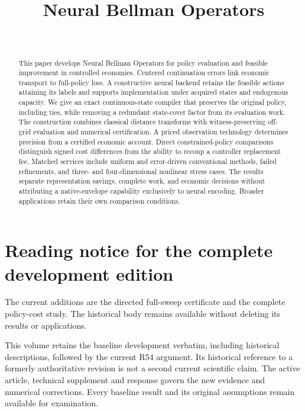 \documentclass[ecta,nameyear,draft]{econsocart}
\begin{document}
\begin{frontmatter}
\title{Neural Bellman Operators}
\begin{aug}
\author[id=au1,addressref={add1}]{~}
\address[id=add1]{Peking University}
\end{aug}
\begin{abstract}
This paper develops Neural Bellman Operators for policy evaluation and feasible improvement in controlled economies. Centered continuation errors link economic transport to full-policy loss. A constructive neural backend retains the feasible actions attaining its labels and supports implementation under acquired states and endogenous capacity. We give an exact continuous-state compiler that preserves the original policy, including ties, while removing a redundant state-cover factor from its evaluation work. The construction combines classical distance transforms with witness-preserving off-grid evaluation and numerical certification. A priced observation technology determines precision from a certified economic account. Direct constrained-policy comparisons distinguish signed cost differences from the ability to recoup a controller replacement fee. Matched services include uniform and error-driven conventional methods, failed refinements, and three- and four-dimensional nonlinear stress cases. The results separate representation savings, complete work, and economic decisions without attributing a native-envelope capability exclusively to neural encoding. Broader applications retain their own comparison conditions.
\end{abstract}
\begin{keyword}
\end{keyword}
\end{frontmatter}
\section*{Reading notice for the complete development edition}
The current additions are the directed full-sweep certificate and the complete policy-cost study. The historical body remains available without deleting its results or applications.

This volume retains the baseline development verbatim, including historical descriptions, followed by the current R54 argument. Its historical reference to a formerly authoritative revision is not a second current scientific claim. The active article, technical supplement and response govern the new evidence and numerical corrections. Every baseline result and its original assumptions remain available for examination.
\end{document}
